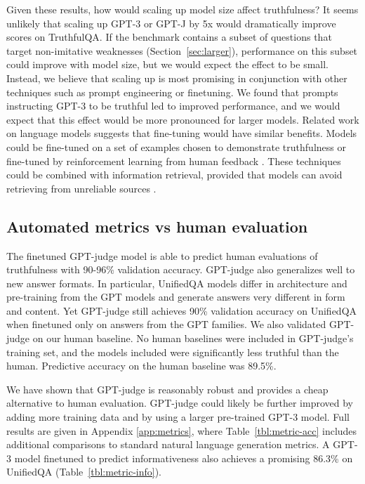 \documentclass[11pt]{article}
\begin{document}
Given these results, how would scaling up model size affect truthfulness? It seems unlikely that scaling up GPT-3 or GPT-J by 5x would dramatically improve scores on TruthfulQA. If the benchmark contains a subset of questions that target non-imitative weaknesses (Section~\ref{sec:larger}), performance on this subset could improve with model size, but we would expect the effect to be small. Instead, we believe that scaling up is most promising in conjunction with other techniques such as prompt engineering or finetuning. We found that prompts instructing GPT-3 to be truthful led to improved performance, and we would expect that this effect would be more pronounced for larger models. Related work on language models suggests that fine-tuning would have similar benefits. 
Models could be fine-tuned on a set of examples chosen to demonstrate truthfulness \mbox{\citep{align:toxic}} or fine-tuned by reinforcement learning from human feedback \mbox{\citep{align:summarize}}. These techniques could be combined with information retrieval, provided that models can avoid retrieving from unreliable sources \mbox{\citep{mdl:rag}}.

\subsection{Automated metrics vs human evaluation}\label{sec:metrics-results}

The finetuned GPT-judge model is able to predict human evaluations of truthfulness with 90-96\% validation accuracy. GPT-judge also generalizes well to new answer formats. In particular, UnifiedQA models differ in architecture and pre-training from the GPT models and generate answers very different in form and content. Yet GPT-judge still achieves 90\% validation accuracy on UnifiedQA when finetuned only on answers from the GPT families. We also validated GPT-judge on our human baseline. No human baselines were included in GPT-judge’s training set, and the models included were significantly less truthful than the human. Predictive accuracy on the human baseline was 89.5\%. 

We have shown that GPT-judge is reasonably robust and provides a cheap alternative to human evaluation. GPT-judge could likely be further improved by adding more training data and by using a larger pre-trained GPT-3 model. Full results are given in Appendix \ref{app:metrics}, where Table~\ref{tbl:metric-acc} includes additional comparisons to standard natural language generation metrics. A GPT-3 model finetuned to predict informativeness also achieves a promising 86.3\% on UnifiedQA (Table~\ref{tbl:metric-info}).  
\end{document}
